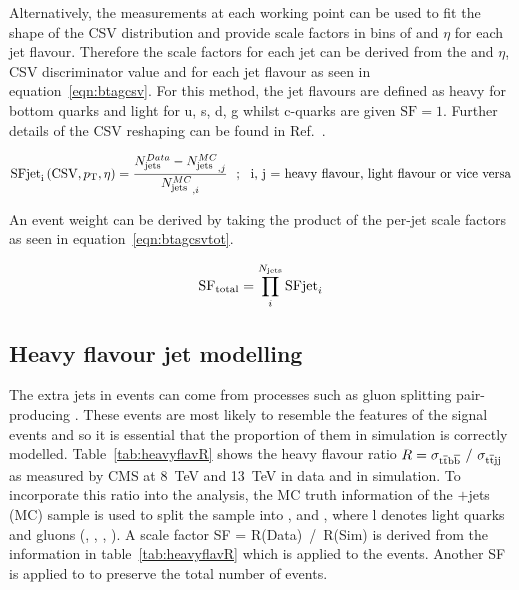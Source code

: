 Alternatively, the measurements at each working point can be used to fit the shape of the CSV distribution and provide scale factors in bins of \pt and $\eta$ for each jet flavour. Therefore the scale factors for each jet can be derived from the \pt and $\eta$, CSV discriminator value and for each jet flavour as seen in equation~\ref{eqn:btagcsv}. For this method, the jet flavours are defined as heavy for bottom quarks and light for u, s, d, g whilst c-quarks are given $\textrm{SF} = 1$. Further details of the CSV reshaping can be found in Ref.~\cite{CMS-NOTE-2013-130}.

\begin{equation}
\textrm{SFjet}_{\textrm{i}} \left(\textrm{CSV},p_{\mathrm{T}},\eta \right) = \frac{N_{\textrm{jets}}^{Data} - {N_{\textrm{jets}}^{MC}}_{,j}}{{N_{\textrm{jets}}^{MC}}_{,i}} ~~;~~ \textrm{i, j = heavy flavour, light flavour or vice versa}\label{eqn:btagcsv}
\end{equation}

An event weight can be derived by taking the product of the per-jet scale factors as seen in equation~\ref{eqn:btagcsvtot}.

\begin{equation}
\textrm{SF}_{\textrm{total}} = \prod_{i}^{N_{\textrm{jets}}}\textrm{SFjet}_{i}
\label{eqn:btagcsvtot}
\end{equation}

\subsection{Heavy flavour jet modelling ~\label{ttbbmod}}
The extra jets in \ttbar events can come from processes such as gluon splitting pair-producing \bbbar. These \ttbb events are most likely to resemble the features of the \tttt signal events and so it is essential that the proportion of them in simulation is correctly modelled. Table~\ref{tab:heavyflavR} shows the heavy flavour ratio $R= \sigma_{\mathrm{t}\overline{\mathrm{t}}\mathrm{b}\overline{\mathrm{b}}}~/~ \sigma_{\mathrm{t}\overline{\mathrm{t}} \textrm{jj} }$ as measured by CMS at 8~TeV and 13~TeV in data and in simulation. To incorporate this ratio into the analysis, the MC truth information of the \ttbar$+$jets (MC) sample is used to split the sample into \ttbb, \ttcc and \ttll, where l denotes light quarks and gluons (\cPqu, \cPqd, \cPqs, \cPg).  A scale factor SF = R(Data)~/~R(Sim) is derived from the information in table~\ref{tab:heavyflavR} which is applied to the \ttbb events. Another SF is applied to \ttll to preserve the total number of \ttbar events.


